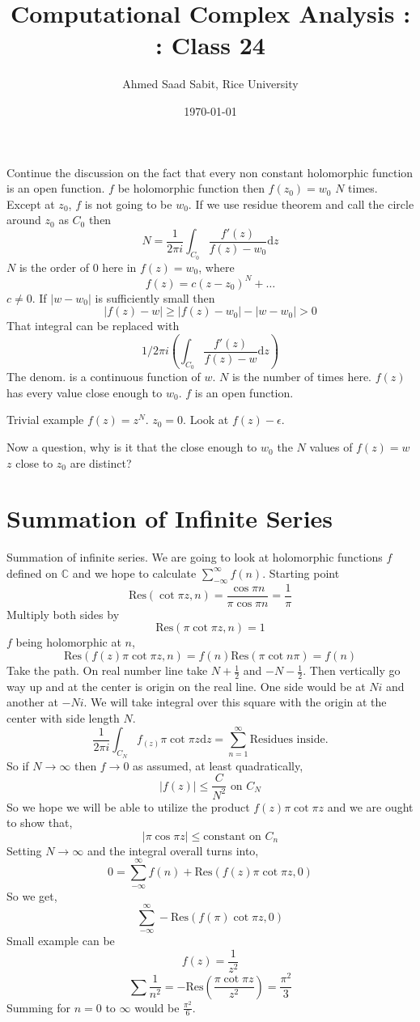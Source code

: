 \documentclass[letter]{article}
\title{Computational Complex Analysis : : Class 24}
\author{Ahmed Saad Sabit, Rice University}
\date{\today}
\begin{document}
\maketitle
 
Continue the discussion on the fact that every non constant holomorphic function is an open function. 
$f$ be holomorphic function then $f(z_0) = w_0$ $N$ times. Except at $z_0$, $f$ is not going to be $w_0$.
If we use residue theorem and call the circle around $z_0$ as $C_0$ then 
\[
N = 	\frac{1}{2\pi i } \int_{C_0} \frac{f'(z)}{f(z) - w_0} \mathrm{d} z
\] 
$N $ is the order of $0$ here in $f(z) = w_0$, where 
\[
f(z) = c(z-z_0)^{N} + \ldots
\] 
$c\neq 0$. If $|w-w_0|$ is sufficiently small then 
\[
|f(z) - w | \ge |f(z) - w_0| - |w- w_0| > 0
\] 
That integral can be replaced with 
\[
1 / 2\pi i \left(
	\int_{C_0} \frac{f'(z)}{f(z) - w} \mathrm{d}  z
\right)
\]
The denom. is a continuous function of $w$. $N$ is the number of times here. $f(z)$ has every value close enough to $w_0$. $f$ is an open function. 

Trivial example $f(z) = z^{N}$. $z_0 = 0$. 
Look at $f(z) - \epsilon$. 

Now a question, why is it that the close enough to $  w_0$ the $N$ values of $f(z) = w$ $z$ close to $z_0$ are distinct? 

\section*{Summation of Infinite Series}

Summation of infinite series. We are going to look at holomorphic functions $f$ defined on $\mathbb{C}$ and we hope to calculate $\sum_{-\infty}^{\infty} f(n)$. Starting point
\[
	\text{Res}(\cot \pi z , n )= \frac{\cos \pi n }{\pi \cos \pi n } = {\frac{1}{ \pi }}
\]
Multiply both sides by 
\[
\text{Res} \left(\pi \cot \pi z, n\right) = 1
\]
$f$ being holomorphic at $n$, 
\[
\text{Res}\left(f(z) \pi \cot \pi z, n\right) = f(n) \text{Res}\left(\pi \cot n \pi \right)= f(n)
\]
Take the path. On real number line take $N+\frac{1}{2}$ and $- N - \frac{1}{2}$. Then vertically go way up and at the center is origin on the real line. 
One side would be at $Ni$ and another at $-Ni$. We will take integral over this square with the origin at the center with side length $N$. 
\[
	\frac{1}{2 \pi i} \int_{C_N} f_(z) \pi \cot \pi z \mathrm{d}  z = \sum_{n=1}^{\infty} \text{Residues inside.}
\]
So if $N\to \infty$ then $f\to 0$ as assumed, at least quadratically, 
\[
|f(z)| \le \frac{C}{N^2} \text{ on } C_N
\]
So we hope we will be able to utilize the product $f(z) \pi \cot \pi z$ and we are ought to show that, 
\[
|\pi \cos \pi z | \le  \text{constant on } C_n
\] 
Setting $N\to \infty$ and the integral overall turns into, 
\[
0 = \sum_{-\infty}^{\infty} f(n) + \text{Res}\left(f(z) \pi \cot \pi z , 0 \right)
\] 
So we get,
\[
\sum_{-\infty}^{\infty} - \text{Res} \left(f(\pi) \cot \pi z, 0\right)
\]
Small example can be 
\[
f(z) = \frac{1}{z^2} 
\] 
\[
	\sum \frac{1}{n^2} = - \text{Res} \left(
		\frac{\pi \cot \pi z}{z^2}
\right) = \frac{\pi^2}{3}
\]
Summing for $n = 0$ to $\infty$ would be $\frac{\pi^2}{6}$. 
\end{document}
